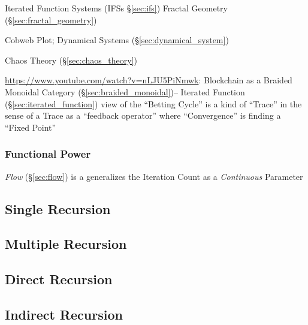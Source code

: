 Iterated Function Systems (IFSs \S\ref{sec:ifs}) \fist Fractal Geometry
(\S\ref{sec:fractal_geometry})

Cobweb Plot; \fist Dynamical Systems (\S\ref{sec:dynamical_system})

Chaos Theory (\S\ref{sec:chaos_theory})

\url{https://www.youtube.com/watch?v=nLJU5PiNmwk}: Blockchain as a Braided
Monoidal Category (\S\ref{sec:braided_monoidal})-- Iterated Function
(\S\ref{sec:iterated_function}) view of the ``Betting Cycle'' is a kind of
``Trace'' in the sense of a Trace as a ``feedback operator'' where
``Convergence'' is finding a ``Fixed Point''



\subsubsection{Functional Power}\label{sec:functional_power}

\emph{Flow} (\S\ref{sec:flow}) is a generalizes the Iteration Count as a
\emph{Continuous} Parameter



\subsection{Single Recursion}\label{sec:single_recursion}

\subsection{Multiple Recursion}\label{sec:multiple_recursion}

\subsection{Direct Recursion}\label{sec:direct_recursion}

\subsection{Indirect Recursion}\label{sec:indirect_recursion}

